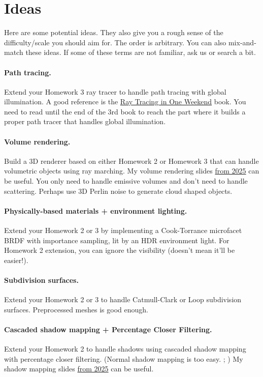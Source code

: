\section{Ideas}

Here are some potential ideas. They also give you a rough sense of the difficulty/scale you should aim for. The order is arbitrary. You can also mix-and-match these ideas. If some of these terms are not familiar, ask us or search a bit.

\paragraph{Path tracing.} Extend your Homework 3 ray tracer to handle path tracing with global illumination. A good reference is the \href{https://raytracing.github.io/}{Ray Tracing in One Weekend} book. You need to read until the end of the 3rd book to reach the part where it builds a proper path tracer that handles global illumination.

\paragraph{Volume rendering.} Build a 3D renderer based on either Homework 2 or Homework 3 that can handle volumetric objects using ray marching. My volume rendering slides \href{https://cseweb.ucsd.edu/~tzli/cse167/fa2025/lectures/27_volume_rendering.pdf}{from 2025} can be useful. You only need to handle emissive volumes and don't need to handle scattering. Perhaps use 3D Perlin noise to generate cloud shaped objects.

\paragraph{Physically-based materials + environment lighting.} Extend your Homework 2 or 3 by implementing a Cook-Torrance microfacet BRDF with importance sampling, lit by an HDR environment light. For Homework 2 extension, you can ignore the visibility (doesn't mean it'll be easier!).

\paragraph{Subdivision surfaces.} Extend your Homework 2 or 3 to handle Catmull-Clark or Loop subdivision surfaces. Preprocessed meshes is good enough.

\paragraph{Cascaded shadow mapping + Percentage Closer Filtering.} Extend your Homework 2 to handle shadows using cascaded shadow mapping with percentage closer filtering. (Normal shadow mapping is too easy. ; ) My shadow mapping slides \href{https://cseweb.ucsd.edu/~tzli/cse167/fa2025/lectures/15_shadow.pdf}{from 2025} can be useful.

